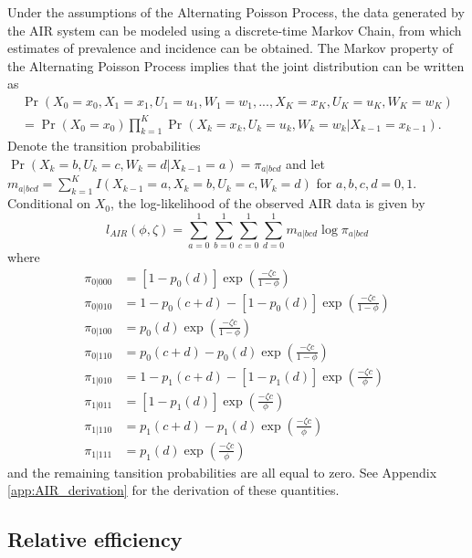 \documentclass[man, noextraspace, floatsintext]{apa6}\usepackage[]{graphicx}\usepackage[]{color}
\begin{document}
Under the assumptions of the Alternating Poisson Process, the data generated by the AIR system can be modeled using a discrete-time Markov Chain, from which estimates of prevalence and incidence can be obtained. The Markov property of the Alternating Poisson Process implies that the joint distribution can be written as
\begin{multline}
\Pr\left(X_0=x_0,X_1=x_1,U_1 = u_1, W_1 = w_1,..., X_K=x_K, U_K = u_K, W_K = w_K \right) \\ = \Pr\left(X_0 = x_0\right) \prod_{k=1}^K \Pr\left(X_k = x_k, U_k = u_k, W_k = w_k | X_{k-1} = x_{k-1}\right). 
\end{multline}
Denote the transition probabilities $\Pr\left(X_k = b, U_k = c, W_k = d | X_{k-1} = a\right) = \pi_{a|bcd}$ and let $m_{a|bcd} = \sum_{k=1}^K I\left(X_{k-1} = a, X_k = b, U_k = c, W_k = d \right)$ for $a,b,c,d = 0,1$. Conditional on $X_0$, the log-likelihood of the observed AIR data is given by
\begin{equation}
\label{eq:AIR_loglik}
l_{AIR}\left(\phi,\zeta\right) = \sum_{a=0}^1 \sum_{b=0}^1 \sum_{c=0}^1 \sum_{d=0}^1 m_{a|bcd} \log \pi_{a|bcd}
\end{equation}
where
\begin{align*}
\pi_{0|000} &= \left[1 - p_0(d)\right]\exp\left(\frac{- \zeta c}{1 - \phi}\right) \\
\pi_{0|010} &= 1 - p_0(c + d) - \left[1 - p_0(d)\right]\exp\left(\frac{- \zeta c}{1 - \phi}\right) \\
\pi_{0|100} &= p_0(d)\exp\left(\frac{- \zeta c}{1 - \phi}\right) \\
\pi_{0|110} &= p_0(c + d) - p_0(d) \exp\left(\frac{- \zeta c}{1 - \phi}\right) \\
\pi_{1|010} &= 1 - p_1(c + d) - \left[1 - p_1(d)\right]\exp\left(\frac{- \zeta c}{\phi}\right) \\
\pi_{1|011} &= \left[1 - p_1(d)\right]\exp\left(\frac{- \zeta c}{\phi}\right) \\
\pi_{1|110} &= p_1(c + d) - p_1(d) \exp\left(\frac{- \zeta c}{\phi}\right) \\
\pi_{1|111} &= p_1(d)\exp\left(\frac{- \zeta c}{\phi}\right)
\end{align*}
and the remaining tansition probabilities are all equal to zero. 
See Appendix \ref{app:AIR_derivation} for the derivation of these quantities.

\subsection{Relative efficiency}
\end{document}
